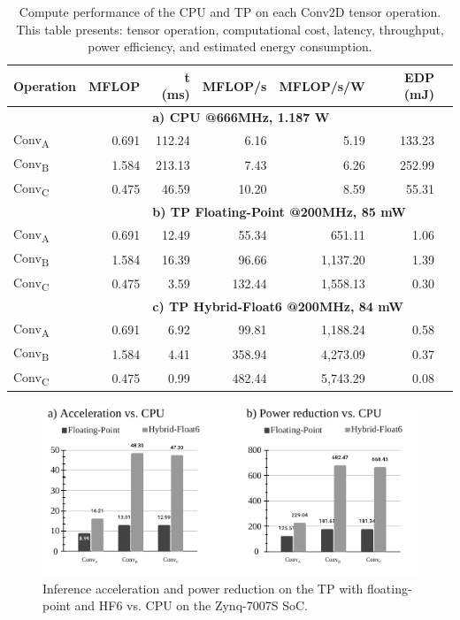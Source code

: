 \begin{table}[!t]\centering
	\caption{Compute performance of the CPU and TP on each Conv2D tensor operation. This table presents: tensor operation, computational cost, latency, throughput, power efficiency, and estimated energy consumption.}\label{tab:performance}
	\scriptsize
	\begin{tabular}{lrrrrrr}\toprule
		\textbf{Operation} &\textbf{MFLOP} &\textbf{t (ms)} &\textbf{MFLOP/s} &\textbf{MFLOP/s/W} &\textbf{EDP (mJ)} \\\midrule
		& &\multicolumn{4}{l}{\textbf{a) CPU @666MHz, 1.187 W}} \\
		Conv\textsubscript{A} &0.691 &112.24 &6.16 &5.19 &133.23 \\
		Conv\textsubscript{B} &1.584 &213.13 &7.43 &6.26 &252.99 \\
		Conv\textsubscript{C} &0.475 &46.59 &10.20 &8.59 &55.31 \\
		& &\multicolumn{4}{l}{\textbf{b) TP Floating-Point @200MHz, 85 mW}} \\
		Conv\textsubscript{A} &0.691 &12.49 &55.34 &651.11 &1.06 \\
		Conv\textsubscript{B} &1.584 &16.39 &96.66 &1,137.20 &1.39 \\
		Conv\textsubscript{C} &0.475 &3.59 &132.44 &1,558.13 &0.30 \\
		& &\multicolumn{4}{l}{\textbf{c) TP Hybrid-Float6 @200MHz, 84 mW}} \\
		Conv\textsubscript{A} &0.691 &6.92 &99.81 &1,188.24 &0.58 \\
		Conv\textsubscript{B} &1.584 &4.41 &358.94 &4,273.09 &0.37 \\
		Conv\textsubscript{C} &0.475 &0.99 &482.44 &5,743.29 &0.08 \\
		\bottomrule
	\end{tabular}
\end{table}

\begin{figure}[t!]
	\centering
	\includegraphics[width=1\columnwidth]{../figures/power_breakdown/acceleration_power_reduction.pdf}
	\caption{Inference acceleration and power reduction on the TP with floating-point and HF6 vs. CPU on the Zynq-7007S SoC.}
	\label{fig:acceleration}
\end{figure}


